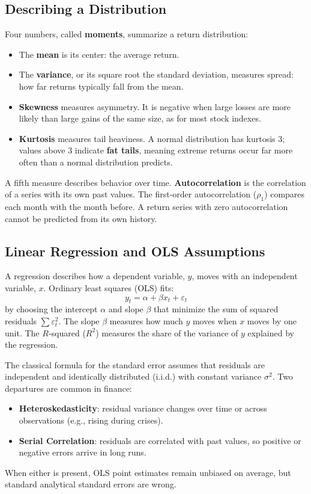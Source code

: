 \subsection{Describing a Distribution}
Four numbers, called \textbf{moments}, summarize a return distribution:
\begin{itemize}
  \item The \textbf{mean} is its center: the average return.
  \item The \textbf{variance}, or its square root the standard deviation, measures spread: how far returns typically fall from the mean.
  \item \textbf{Skewness} measures asymmetry. It is negative when large losses are more likely than large gains of the same size, as for most stock indexes.
  \item \textbf{Kurtosis} measures tail heaviness. A normal distribution has kurtosis 3; values above 3 indicate \textbf{fat tails}, meaning extreme returns occur far more often than a normal distribution predicts.
\end{itemize}

A fifth measure describes behavior over time. \textbf{Autocorrelation} is the correlation of a series with its own past values. The first-order autocorrelation ($\rho_1$) compares each month with the month before. A return series with zero autocorrelation cannot be predicted from its own history.

\subsection{Linear Regression and OLS Assumptions}
\label{sec:03-regression}
A regression describes how a dependent variable, $y$, moves with an independent variable, $x$. Ordinary least squares (OLS) fits:
\begin{equation}
  y_t = \alpha + \beta x_t + \varepsilon_t
  \label{eq:03-ols}
\end{equation}
by choosing the intercept $\alpha$ and slope $\beta$ that minimize the sum of squared residuals $\sum \varepsilon_t^2$. The slope $\beta$ measures how much $y$ moves when $x$ moves by one unit. The $R$-squared ($R^2$) measures the share of the variance of $y$ explained by the regression.

The classical formula for the standard error assumes that residuals are independent and identically distributed (i.i.d.) with constant variance $\sigma^2$. Two departures are common in finance:
\begin{itemize}
  \item \textbf{Heteroskedasticity}: residual variance changes over time or across observations (e.g., rising during crises).
  \item \textbf{Serial Correlation}: residuals are correlated with past values, so positive or negative errors arrive in long runs.
\end{itemize}
When either is present, OLS point estimates remain unbiased on average, but standard analytical standard errors are wrong.

